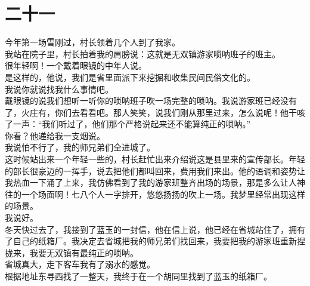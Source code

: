 \fancyhead[RO]{\thepage} %
\fancyhead[LE]{\thepage} %
\fancyfoot[LE,RO]{}
\fancyfoot[LO,CE]{}
\fancyfoot[CO,RE]{}
\chapter*{二十一}
今年第一场雪刚过，村长领着几个人到了我家。\\

我站在院子里，村长拍着我的肩膀说：这就是无双镇游家唢呐班子的班主。\\

很年轻啊！一个戴着眼镜的中年人说。\\

是这样的，他说，我们是省里面派下来挖掘和收集民间民俗文化的。\\

我说你就说找我什么事情吧。\\

戴眼镜的说我们想听一听你的唢呐班子吹一场完整的唢呐。我说游家班已经没有了，火庄有，你们去看看吧。那人笑笑，说我们刚从那里过来，怎么说呢！他干咳了一声：“我们听过了，他们那个严格说起来还不能算纯正的唢呐。”\\

你看？他递给我一支烟说。\\

我说怕不行了，我的师兄弟们全进城了。\\

这时候站出来一个年轻一些的，村长赶忙出来介绍说这是县里来的宣传部长。年轻的部长很豪迈的一挥手，说去把他们都叫回来，费用我们来出。他的语调和姿势让我热血一下涌了上来，我仿佛看到了我的游家班整齐出场的场景，那是多么让人神往的一个场面啊！七八个人一字排开，悠悠扬扬的吹上一场。我梦里经常出现这样的场景。\\

我说好。\\

冬天快过去了，我接到了蓝玉的一封信，他在信上说，他已经在省城站住了，拥有了自己的纸箱厂。我决定去省城把我的师兄弟们找回来，我要把我的游家班重新捏拢来，我要无双镇有最纯正的唢呐。\\

省城真大，走下客车我有了溺水的感觉。\\

根据地址东寻西找了一整天，我终于在一个胡同里找到了蓝玉的纸箱厂。\\

